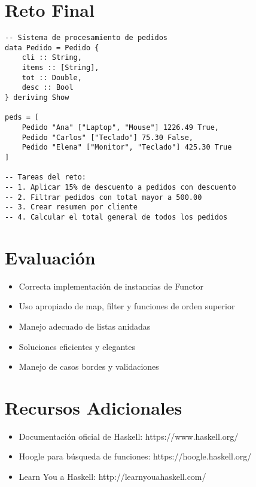 \documentclass[12pt]{article}
\begin{document}
\section*{Reto Final}
\begin{lstlisting}[style=haskell]
-- Sistema de procesamiento de pedidos
data Pedido = Pedido {
    cli :: String,
    items :: [String],
    tot :: Double,
    desc :: Bool
} deriving Show

peds = [
    Pedido "Ana" ["Laptop", "Mouse"] 1226.49 True,
    Pedido "Carlos" ["Teclado"] 75.30 False,
    Pedido "Elena" ["Monitor", "Teclado"] 425.30 True
]

-- Tareas del reto:
-- 1. Aplicar 15% de descuento a pedidos con descuento
-- 2. Filtrar pedidos con total mayor a 500.00
-- 3. Crear resumen por cliente
-- 4. Calcular el total general de todos los pedidos
\end{lstlisting}

\section*{Evaluación}
\begin{itemize}
\item Correcta implementación de instancias de Functor
\item Uso apropiado de map, filter y funciones de orden superior
\item Manejo adecuado de listas anidadas
\item Soluciones eficientes y elegantes
\item Manejo de casos bordes y validaciones
\end{itemize}

\section*{Recursos Adicionales}
\begin{itemize}
\item Documentación oficial de Haskell: https://www.haskell.org/
\item Hoogle para búsqueda de funciones: https://hoogle.haskell.org/
\item Learn You a Haskell: http://learnyouahaskell.com/
\end{itemize}
\end{document}
